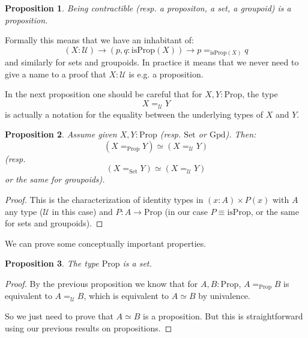 \documentclass{article}
\newcommand{\U}{{\mathcal U}}
\renewcommand{\r}{\rightarrow}
\newcommand{\Set}{\mathrm{Set}}
\newcommand{\Prop}{\mathrm{Prop}}
\newcommand{\Gpd}{\mathrm{Gpd}}
\newtheorem{proposition}{Proposition}
\begin{document}
\begin{proposition}
Being contractible (resp. a propositon, a set, a groupoid) is a proposition.
\end{proposition}

Formally this means that we have an inhabitant of:
\[(X:\U)\r (p,q:\mathrm{isProp}(X)) \r p=_{\mathrm{isProp}(X)} q\] 
and similarly for sets and groupoids. In practice it means that we never need to give a name to a proof that $X:\U$ is e.g. a proposition.

In the next proposition one should be careful that for $X,Y:\Prop$, the type 
\[X=_\U Y\] 
is actually a notation for the equality between the underlying types of $X$ and $Y$.%

\begin{proposition}
Assume given $X,Y:\Prop$ (resp. $\Set$ or $\Gpd$). Then:
\[(X=_\Prop Y) \simeq (X=_\U Y)\]
(resp. 
\[(X=_\Set Y) \simeq (X=_\U Y)\]
or the same for groupoids).
\end{proposition}
\begin{proof}
This is the characterization of identity types in $(x:A)\times P(x)$ with $A$ any type ($\U$ in this case) and $P:A\r \Prop$ (in our case $P\equiv\mathrm{isProp}$, or the same for sets and groupoids). %
\end{proof}


We can prove some conceptually important properties.

\begin{proposition}
The type $\Prop$ is a set.
\end{proposition}
\begin{proof}
By the previous proposition we know that for $A,B:\Prop$, $A=_\Prop B$ is equivalent to $A=_\U B$, which is equivalent to $A\simeq B$ by univalence.

So we just need to prove that $A\simeq B$ is a proposition. But this is straightforward using our previous results on propositions. %
\end{proof}
\end{document}
